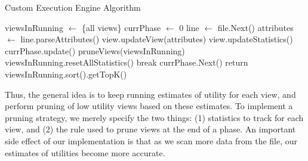 

\begin{algorithm}
\caption{Custom Execution Engine Algorithm}
\label{algo:custom_exec_engine}
\begin{algorithmic}[1]
\State viewsInRunning $\gets$ \{all views\}
\State currPhase $\gets$ 0
\State line $\gets$ file.Next()
\State attributes $\gets$ line.parseAttributes()
\State view.updateView(attributes)
\State view.updateStatistics()
\EndFor
\State currPhase.update()
\State pruneViews(viewsInRunning)
\State viewsInRunning.resetAllStatistics()
\State break
\EndIf
\State currPhase.Next()
\EndIf
\EndWhile
\State return viewsInRunning.sort().getTopK()
\end{algorithmic}
\end{algorithm}

Thus, the general idea is to keep running estimates of utility for each view, and
perform pruning of low utility views based on these estimates.
To implement a pruning strategy, we merely specify the two things: (1)
statistics to track for each view, and (2) the rule used to prune views at the
end of a phase.
An important side effect of our implementation is that
as we scan more data from the file, our estimates of utilities become more
accurate.


